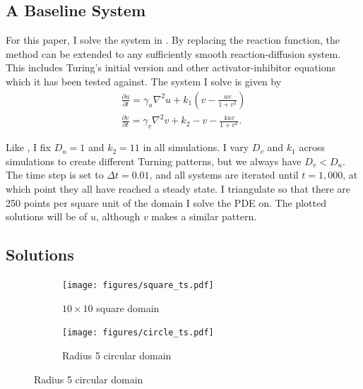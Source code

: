 \subsection{A Baseline System}

For this paper, I solve the system in \autocites{othmer2009intersection}{jeong2017numerical}. By replacing the reaction function, the method can be extended to any sufficiently smooth reaction-diffusion system. This includes Turing's initial version \parencites{turing1990chemical}{de2020leopard} and other activator-inhibitor equations \parencites{landge2020pattern}{meinhardt2000pattern} which it has been tested against. The system I solve is given by
\begin{align*}
    \frac{\partial u}{\partial t} = \gamma_u \nabla^2 u + k_1 \left(v - \frac{uv}{1 + v^2}\right) \\
    \frac{\partial v}{\partial t} = \gamma_v \nabla^2 v + k_2 - v - \frac{4 u v}{1 + v^2}.
\end{align*}

Like \autocite{jeong2017numerical}, I fix $D_u = 1$ and $k_2 = 11$ in all simulations. I vary $D_v$ and $k_1$ across simulations to create different Turning patterns, but we always have $D_v< D_u$. The time step is set to $\Delta t = 0.01$, and all systems are iterated until $t = 1,000$, at which point they all have reached a steady state. I triangulate so that there are 250 points per square unit of the domain I solve the PDE on. The plotted solutions will be of $u$, although $v$ makes a similar pattern.


\subsection{Solutions}

\begin{figure}[t!]
    \centering
    \caption{Solutions to the reaction-diffusion system}

    \begin{subfigure}{\textwidth}
        \centering
        \texttt{[image: figures/square\_ts.pdf]}
        \caption{$10 \times 10$ square domain}
    \end{subfigure}

    \begin{subfigure}{\textwidth}
        \centering
        \texttt{[image: figures/circle\_ts.pdf]}
        \caption{Radius 5 circular domain}
    \end{subfigure}

    \label{fig:sol-ts}
\end{figure}

